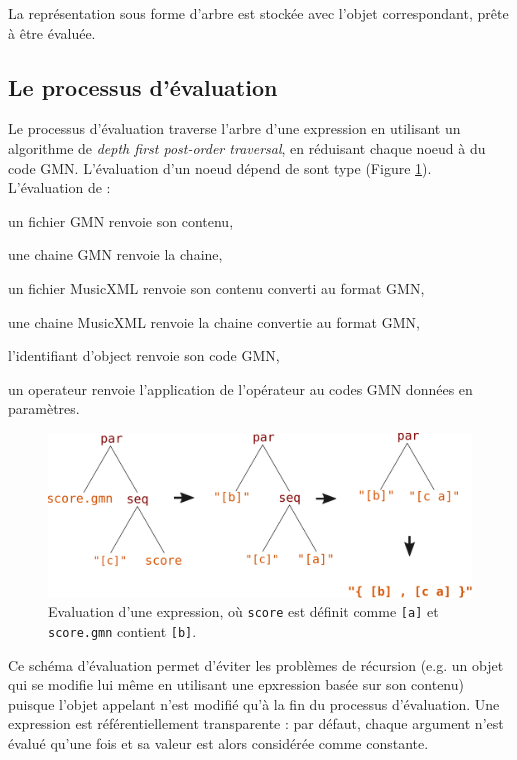 \documentclass{article}
\newcommand{\OSC}[1]{\texttt{#1}}
\let\olditemize\itemize
\let\oldenditemize\enditemize
\renewenvironment{itemize} 	{\olditemize \setlength{\itemsep}{1mm}}{\oldenditemize}
\begin{document}
La représentation sous forme d'arbre est stockée avec l'objet correspondant, prête à être évaluée.

\subsection{Le processus d'évaluation}
Le processus d'évaluation traverse l'arbre d'une expression en utilisant un algorithme de \textit{depth first post-order traversal}, en réduisant chaque noeud à du code GMN.
L'évaluation d'un noeud dépend de sont type (Figure \ref{fig:classicEval}). \\
L'évaluation de :
\begin{itemize}
\item un fichier GMN renvoie son contenu,
\item une chaine GMN renvoie la chaine,
\item un fichier MusicXML renvoie son contenu converti au format GMN,
\item une chaine MusicXML renvoie la chaine convertie au format GMN,
\item l'identifiant d'object renvoie son code GMN,
\item un operateur renvoie l'application de l'opérateur au codes GMN données en paramètres.
\end{itemize}

\begin{figure}[th]
\centering
\includegraphics[width=1\columnwidth]{imgs/classicEval}
\caption{Evaluation d'une expression,
où \OSC{score} est définit comme \OSC{[a]}
et \OSC{score.gmn} contient \OSC{[b]}.
\label{fig:classicEval} }
\end{figure}

Ce schéma d'évaluation permet d'éviter les problèmes de récursion (e.g. un objet qui se modifie lui même en utilisant une epxression basée sur son contenu) puisque l'objet appelant n'est modifié qu'à la fin du processus d'évaluation. 
Une expression est référentiellement transparente : par défaut, chaque argument n'est évalué qu'une fois et sa valeur est alors considérée comme constante.
\end{document}
